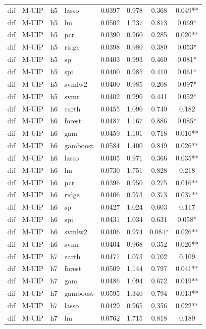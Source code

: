 \begin{ThreePartTable}
\begin{longtable}[t]{llclcccc}
dif & M-UIP & h5 & lasso & 0.0397 & 0.978 & 0.368 & 0.049**\\
dif & M-UIP & h5 & lm & 0.0502 & 1.237 & 0.813 & 0.069*\\
dif & M-UIP & h5 & pcr & 0.0390 & 0.960 & 0.285 & 0.020**\\
dif & M-UIP & h5 & ridge & 0.0398 & 0.980 & 0.380 & 0.053*\\
dif & M-UIP & h5 & sp & 0.0403 & 0.993 & 0.460 & 0.081*\\
dif & M-UIP & h5 & spi & 0.0400 & 0.985 & 0.410 & 0.061*\\
dif & M-UIP & h5 & svmlw2 & 0.0400 & 0.985 & 0.208 & 0.097*\\
dif & M-UIP & h5 & svmr & 0.0402 & 0.990 & 0.441 & 0.052*\\
\addlinespace
dif & M-UIP & h6 & earth & 0.0455 & 1.090 & 0.740 & 0.182\\
dif & M-UIP & h6 & forest & 0.0487 & 1.167 & 0.886 & 0.085*\\
dif & M-UIP & h6 & gam & 0.0459 & 1.101 & 0.718 & 0.016**\\
dif & M-UIP & h6 & gamboost & 0.0584 & 1.400 & 0.849 & 0.026**\\
dif & M-UIP & h6 & lasso & 0.0405 & 0.971 & 0.366 & 0.035**\\
dif & M-UIP & h6 & lm & 0.0730 & 1.751 & 0.828 & 0.218\\
dif & M-UIP & h6 & pcr & 0.0396 & 0.950 & 0.275 & 0.016**\\
dif & M-UIP & h6 & ridge & 0.0406 & 0.973 & 0.373 & 0.037**\\
dif & M-UIP & h6 & sp & 0.0427 & 1.024 & 0.603 & 0.117\\
dif & M-UIP & h6 & spi & 0.0431 & 1.034 & 0.631 & 0.058*\\
dif & M-UIP & h6 & svmlw2 & 0.0406 & 0.974 & 0.084* & 0.026**\\
dif & M-UIP & h6 & svmr & 0.0404 & 0.968 & 0.352 & 0.026**\\
\addlinespace
dif & M-UIP & h7 & earth & 0.0477 & 1.073 & 0.702 & 0.109\\
dif & M-UIP & h7 & forest & 0.0509 & 1.144 & 0.797 & 0.041**\\
dif & M-UIP & h7 & gam & 0.0486 & 1.094 & 0.672 & 0.019**\\
dif & M-UIP & h7 & gamboost & 0.0595 & 1.340 & 0.794 & 0.013**\\
dif & M-UIP & h7 & lasso & 0.0429 & 0.965 & 0.356 & 0.022**\\
dif & M-UIP & h7 & lm & 0.0762 & 1.715 & 0.818 & 0.189\\

\end{longtable}
\end{ThreePartTable}
